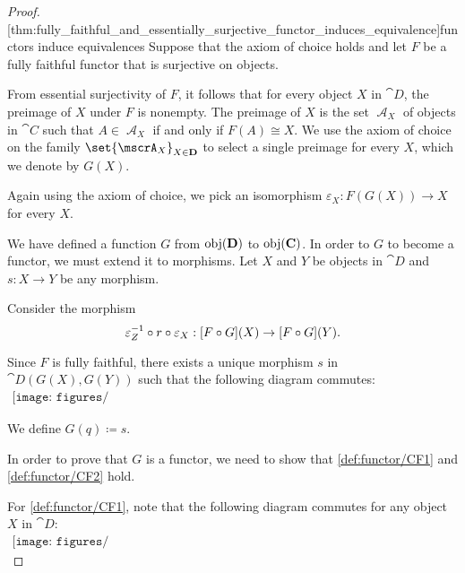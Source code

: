 \begin{proof}
  [thm:fully_faithful_and_essentially_surjective_functor_induces_equivalence]{functors induce equivalences} Suppose that the axiom of choice holds and let \( F \) be a fully faithful functor that is surjective on objects.

  From essential surjectivity of \( F \), it follows that for every object \( X \) in \( \cat{D} \), the preimage of \( X \) under \( F \) is nonempty. The preimage of \( X \) is the set \( \mscrA_X \) of objects in \( \cat{C} \) such that \( A \in \mscrA_X \) if and only if \( F(A) \cong X \). We use the axiom of choice on the family \( \set{ \mscrA_X }_{X \in \cat{D}} \) to select a single preimage for every \( X \), which we denote by \( G(X) \).

  Again using the axiom of choice, we pick an isomorphism \( \varepsilon_X: F(G(X)) \to X \) for every \( X \).

  We have defined a function \( G \) from \( \operatorname{obj}(\operatorname{\mathbf{D}}) \) to \( \operatorname{obj}(\operatorname{\mathbf{C}}) \). In order to \( G \) to become a functor, we must extend it to morphisms. Let \( X \) and \( Y \) be objects in \( \cat{D} \) and \( s: X \to Y \) be any morphism.

  Consider the morphism
  \begin{equation*}
    \varepsilon_Z^{-1} \bincirc r \bincirc \varepsilon_X: [F \bincirc G](X) \to [F \bincirc G](Y).
  \end{equation*}

  Since \( F \) is fully faithful, there exists a unique morphism \( s \) in \( \cat{D}(G(X), G(Y)) \) such that the following diagram commutes:
  \begin{equation}\label{eq:thm__fully_faithful_and_essentially_surjective_functor_induces_equivalence/inverse_morphism_definition}
    \begin{aligned}
      \texttt{[image: figures/thm\_\_fully\_faithful\_and\_essentially\_surjective\_functor\_induces\_equivalence.pdf]}
    \end{aligned}
  \end{equation}

  We define \( G(q) \coloneqq s \).

  In order to prove that \( G \) is a functor, we need to show that \ref{def:functor/CF1} and \ref{def:functor/CF2} hold.

  For \ref{def:functor/CF1}, note that the following diagram commutes for any object \( X \) in \( \cat{D} \):
  \begin{equation}\label{eq:thm__fully_faithful_and_essentially_surjective_functor_induces_equivalence/identity}
    \begin{aligned}
      \texttt{[image: figures/thm\_\_fully\_faithful\_and\_essentially\_surjective\_functor\_induces\_equivalence.pdf]}
    \end{aligned}
  \end{equation}


\end{proof}
